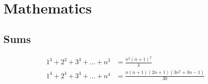 
\chapter{Mathematics}

\section{Sums}
\begin{align*}
	1^3 + 2^3 + 3^3 + \dots + n^3 &= \frac{n^2(n+1)^2}{4} \\
	1^4 + 2^4 + 3^4 + \dots + n^4 &= \frac{n(n+1)(2n+1)(3n^2 + 3n - 1)}{30} \\
\end{align*}
